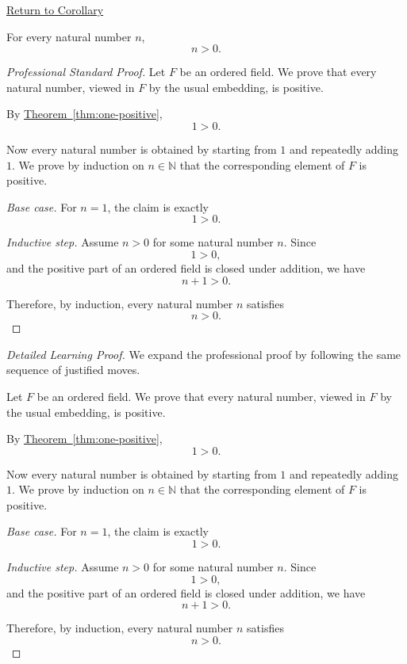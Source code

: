 \newpage
{}
\label{prf:n-positive}

\begin{remark*}[Return]
\hyperref[cor:n-positive]{Return to Corollary}
\end{remark*}

\begin{corollary*}
For every natural number $n$,
\[
n>0.
\]
\end{corollary*}

\begin{proof}[Professional Standard Proof]
\LRAProofBodyStart
Let $F$ be an ordered field.  We prove that every natural number, viewed in
$F$ by the usual embedding, is positive.

By \hyperref[thm:one-positive]{Theorem~\ref*{thm:one-positive}},
\[
1>0.
\]

Now every natural number is obtained by starting from $1$ and repeatedly
adding $1$.  We prove by induction on $n\in\mathbb{N}$ that the
corresponding element of $F$ is positive.

\emph{Base case.}  For $n=1$, the claim is exactly
\[
1>0.
\]

\emph{Inductive step.}  Assume $n>0$ for some natural number $n$.  Since
\[
1>0,
\]
and the positive part of an ordered field is closed under addition, we have
\[
n+1>0.
\]

Therefore, by induction, every natural number $n$ satisfies
\[
n>0.
\]
\end{proof}

\begin{proof}[Detailed Learning Proof]
\LRAProofBodyStart
We expand the professional proof by following the same sequence of justified moves.

Let $F$ be an ordered field.  We prove that every natural number, viewed in
$F$ by the usual embedding, is positive.

By \hyperref[thm:one-positive]{Theorem~\ref*{thm:one-positive}},
\[
1>0.
\]

Now every natural number is obtained by starting from $1$ and repeatedly
adding $1$.  We prove by induction on $n\in\mathbb{N}$ that the
corresponding element of $F$ is positive.

\emph{Base case.}  For $n=1$, the claim is exactly
\[
1>0.
\]

\emph{Inductive step.}  Assume $n>0$ for some natural number $n$.  Since
\[
1>0,
\]
and the positive part of an ordered field is closed under addition, we have
\[
n+1>0.
\]

Therefore, by induction, every natural number $n$ satisfies
\[
n>0.
\]
\end{proof}

